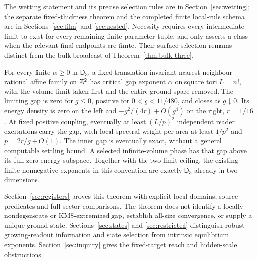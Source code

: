 The wetting statement and its precise selection rules are in
Section~\ref{sec:wetting}; the separate fixed-thickness theorem and the
completed finite local-rule schema are in Sections~\ref{sec:film} and
\ref{sec:nested}. Necessity requires every intermediate limit to exist
for every remaining finite parameter tuple, and only asserts a class
when the relevant final endpoints are finite. Their surface selection remains distinct from the bulk broadcast
of Theorem~\ref{thm:bulk-three}.

\begin{theorem}\label{thm:register-headline}
For every finite $\alpha\geq0$ in $\mathsf D_3$, a fixed
translation-invariant nearest-neighbour rational affine family on
$\mathbb Z^2$ has critical gap exponent $\alpha$ on square tori $L=n!$,
with the volume limit taken first and the entire ground space removed.
The limiting gap is zero for $g\leq0$, positive for $0<g<11/480$,
and closes as $g\downarrow0$. Its energy density is zero on the left
and $-g^2/(4r)+O(g^4)$ on the right, $r=1/16$.
At fixed positive coupling, eventually at least $(L/p)^2$ independent
reader excitations carry the gap, with local spectral weight per area
at least $1/p^2$ and $p=2r/g+O(1)$. The inner gap is eventually
exact, without a general computable settling bound. A selected
infinite-volume phase has that gap above its full zero-energy subspace.
Together with the two-limit ceiling, the existing finite nonnegative
exponents in this convention are exactly $\mathsf D_3$ already in
two dimensions.
\end{theorem}
Section~\ref{sec:registers} proves this theorem with explicit local
domains, source predicates and full-sector comparisons. The theorem
does not identify a locally nondegenerate or KMS-extremized gap,
establish all-size convergence, or supply a unique ground state.
Sections~\ref{sec:states} and \ref{sec:restricted} distinguish
robust growing-readout information and state selection from intrinsic
equilibrium exponents. Section~\ref{sec:inquiry} gives the fixed-target
reach and hidden-scale obstructions.

